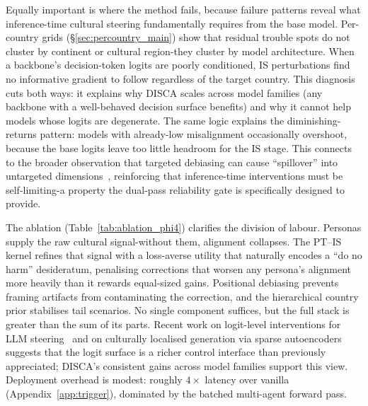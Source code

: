 \documentclass{article}
\begin{document}
Equally important is where the method fails, because failure patterns reveal what inference-time cultural steering fundamentally requires from the base model. Per-country grids (\S\ref{sec:percountry_main}) show that residual trouble spots do not cluster by continent or cultural region-they cluster by model architecture. When a backbone's decision-token logits are poorly conditioned, IS perturbations find no informative gradient to follow regardless of the target country. This diagnosis cuts both ways: it explains why DISCA scales across model families (any backbone with a well-behaved decision surface benefits) and why it cannot help models whose logits are degenerate. The same logic explains the diminishing-returns pattern: models with already-low misalignment occasionally overshoot, because the base logits leave too little headroom for the IS stage. This connects to the broader observation that targeted debiasing can cause ``spillover'' into untargeted dimensions~\citep{guo2025nofree}, reinforcing that inference-time interventions must be self-limiting-a property the dual-pass reliability gate is specifically designed to provide.

The ablation (Table~\ref{tab:ablation_phi4}) clarifies the division of labour. Personas supply the raw cultural signal-without them, alignment collapses. The PT--IS kernel refines that signal with a loss-averse utility that naturally encodes a ``do no harm'' desideratum, penalising corrections that worsen any persona's alignment more heavily than it rewards equal-sized gains. Positional debiasing prevents framing artifacts from contaminating the correction, and the hierarchical country prior stabilises tail scenarios. No single component suffices, but the full stack is greater than the sum of its parts. Recent work on logit-level interventions for LLM steering~\citep{an2026logit} and on culturally localised generation via sparse autoencoders~\citep{khanuja2026steering} suggests that the logit surface is a richer control interface than previously appreciated; DISCA's consistent gains across model families support this view. Deployment overhead is modest: roughly $4\times$ latency over vanilla (Appendix~\ref{app:trigger}), dominated by the batched multi-agent forward pass.
\end{document}
